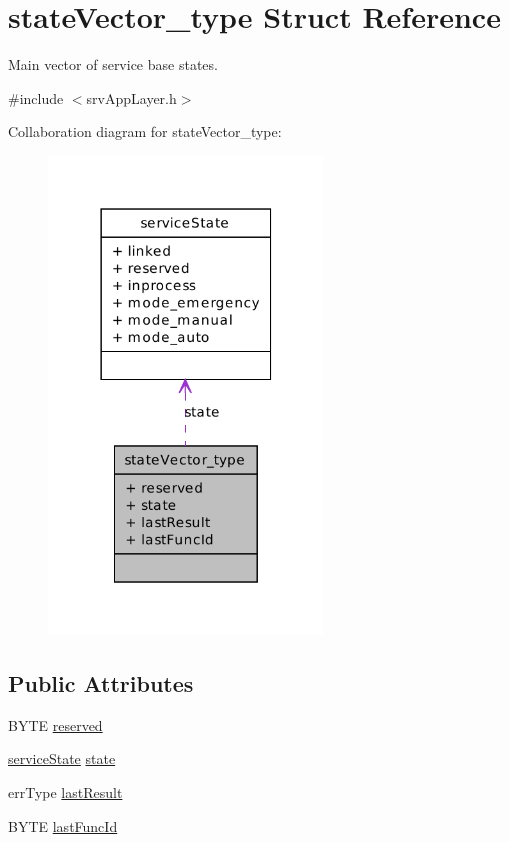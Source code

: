 \hypertarget{structstateVector__type}{
\section{stateVector\_\-type Struct Reference}
\label{d8/db4/structstateVector__type}
}


Main vector of service base states.  




{\ttfamily \#include $<$srvAppLayer.h$>$}



Collaboration diagram for stateVector\_\-type:\nopagebreak
\begin{figure}[H]
\begin{center}
\leavevmode
\includegraphics[width=206pt]{d1/d26/structstateVector__type__coll__graph}
\end{center}
\end{figure}
\subsection*{Public Attributes}
\begin{DoxyCompactItemize}
\item 
BYTE \hyperlink{structstateVector__type_a92d4718b4aebde4fe96ae5fec2629849}{reserved}
\item 
\hyperlink{structserviceState}{serviceState} \hyperlink{structstateVector__type_a1e2684cb87445b9349a42be23f510eee}{state}
\item 
errType \hyperlink{structstateVector__type_a614aaf5cf7456ef97a7e0310f9f0ad17}{lastResult}
\item 
BYTE \hyperlink{structstateVector__type_acb4d13284c9926c9be57f7197ec3f803}{lastFuncId}
\end{DoxyCompactItemize}


